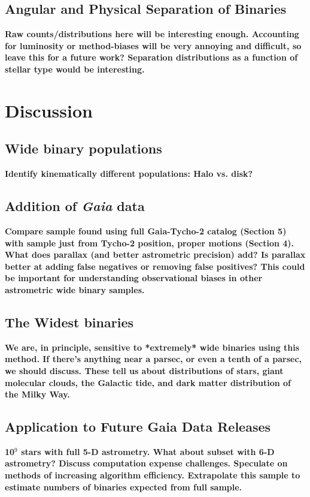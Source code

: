 \documentclass[usenatbib]{mnras}
\begin{document}
\subsection{Angular and Physical Separation of Binaries}
{\bf Raw counts/distributions here will be interesting enough. Accounting for luminosity or method-biases will be very annoying and difficult, so leave this for a future work? Separation distributions as a function of stellar type would be interesting.}




\section{Discussion}

\subsection{Wide binary populations}
{\bf Identify kinematically different populations: Halo vs. disk?}

\subsection{Addition of {\it Gaia} data}
{\bf Compare sample found using full Gaia-Tycho-2 catalog (Section 5) with sample just from Tycho-2 position, proper motions (Section 4).  What does parallax (and better astrometric precision) add? Is parallax better at adding false negatives or removing false positives? This could be important for understanding observational biases in other astrometric wide binary samples.}

\subsection{The Widest binaries}
{\bf We are, in principle, sensitive to *extremely* wide binaries using this method. If there's anything near a parsec, or even a tenth of a parsec, we should discuss. These tell us about distributions of stars, giant molecular clouds, the Galactic tide, and dark matter distribution of the Milky Way. }

\subsection{Application to Future Gaia Data Releases}
{\bf 10$^9$ stars with full 5-D astrometry. What about subset with 6-D astrometry? Discuss computation expense challenges. Speculate on methods of increasing algorithm efficiency. Extrapolate this sample to estimate numbers of binaries expected from full sample. } 
\end{document}
